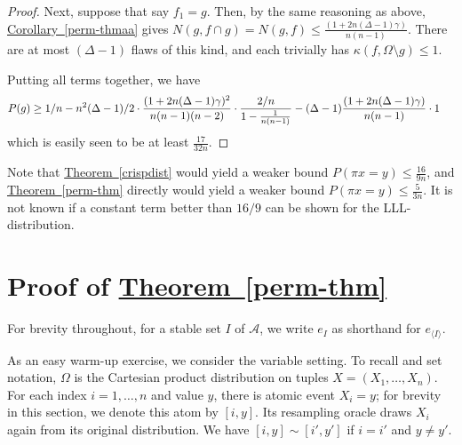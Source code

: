 \documentclass[11pt]{article}
\newcommand{\expref}[2]{\texorpdfstring{\hyperref[#2]{#1~\ref{#2}}}{#1~\ref{#2}}}
\begin{document}
\begin{proof}
Next, suppose that say $f_1 = g$. Then, by the same reasoning as above, \expref{Corollary}{perm-thmaa}  gives $N( g, f \cap g) = N( g, f) \leq \frac{(1 + 2 n (\Delta - 1) \gamma)}{n(n-1)}$. There are at most $(\Delta-1)$ flaws of this kind, and each trivially has $\kappa(f, \Omega \setminus g) \leq 1$.   

    Putting all terms together, we have
 \begin{align*}
  &P(g)  \geq 1/n  -  n^2 (\Delta-1)/2  \cdot \frac{ (1 + 2 n (\Delta - 1) \gamma)^2}{n(n-1)(n-2)} \cdot \frac{ 2/n }{1 - \frac{1}{n(n-1)} } -  (\Delta-1) \frac{ (1 + 2 n (\Delta - 1) \gamma)}{n(n-1)} \cdot 1 \thickspace
  \end{align*}
  which is easily seen to be at least $\frac{17}{32 n}$. 
  \end{proof}
  
  
  Note that \expref{Theorem}{crispdist} would yield a weaker bound $P( \pi x = y) \leq \frac{16}{9 n}$, and \expref{Theorem}{perm-thm} directly would yield a weaker bound $P( \pi x = y) \leq \frac{5}{3 n}$. It is not known if a constant term better than $16/9$ can be shown for the LLL-distribution.

 

  
\appendix



\section{Proof of \expref{Theorem}{perm-thm}}
\label{perm-app}
For brevity throughout, for a stable set $I$ of $\mathcal A$, we write $e_I$ as shorthand for $e_{\langle I \rangle}$.

 As an easy warm-up exercise, we consider the variable setting. To recall and set notation, $\Omega$ is the Cartesian product distribution on tuples $X = (X_1, \dots, X_n)$. For each index $i = 1, \dots, n$ and value $y$, there is atomic event $X_i = y$; for brevity in this section, we denote this atom by $[i, y]$. Its resampling oracle draws $X_i$ again from its original distribution. We have $[i,y] \sim [i', y']$ if $i = i'$ and $y \neq y'$.
\end{document}
